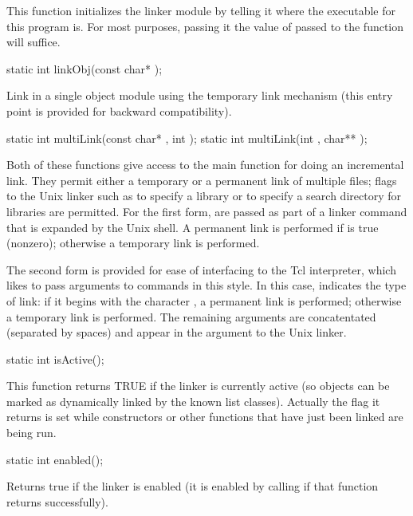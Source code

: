 This function initializes the linker module by telling it where the
executable for this program is.  For most purposes, passing it the
value of  passed to the  function will
suffice.

\begin{example}
static int linkObj(const char* );
\end{example}

Link in a single object module using the temporary link mechanism
(this entry point is provided for backward compatibility).

\begin{example}
static int multiLink(const char* , int );
static int multiLink(int , char** );
\end{example}

Both of these functions give access to the main function for doing
an incremental link.  They permit either a temporary or a permanent
link of multiple files; flags to the Unix linker such as 
to specify a library or  to specify a search directory for
libraries are permitted.  For the first form,  are passed
as part of a linker command that is expanded by the Unix shell.  A
permanent link is performed if  is true (nonzero);
otherwise a temporary link is performed.

The second form is provided for ease of interfacing to the Tcl
interpreter, which likes to pass arguments to commands in this
style.  In this case,  indicates the type of
link: if it begins with the character , a permanent link
is performed; otherwise a temporary link is performed.  The remaining
arguments are concatentated (separated by spaces) and appear in the
argument to the Unix linker.

\begin{example}
static int isActive();
\end{example}


This function returns TRUE if the linker is currently active (so objects
can be marked as dynamically linked by the known list classes).
Actually the flag it returns is set while constructors or other
functions that have just been linked are being run.

\begin{example}
static int enabled();
\end{example}

Returns true if the linker is enabled (it is enabled by calling
 if that function returns successfully).

